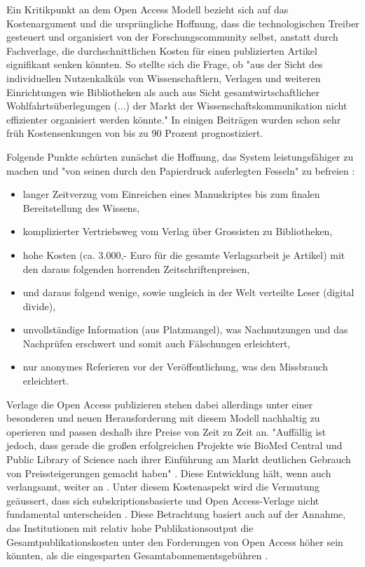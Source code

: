 Ein Kritikpunkt an dem Open Access Modell bezieht sich auf das Kostenargument und die ursprüngliche Hoffnung, dass die technologischen Treiber gesteuert und organisiert von der Forschungscommunity selbst, anstatt durch Fachverlage, die durchschnittlichen Kosten für einen publizierten Artikel signifikant senken könnten. So stellte sich die Frage, ob "aus der Sicht des individuellen Nutzenkalküls von Wissenschaftlern, Verlagen und weiteren Einrichtungen wie Bibliotheken als auch aus Sicht gesamtwirtschaftlicher Wohlfahrtsüberlegungen (...) der Markt der Wissenschaftskommunikation nicht effizienter organisiert werden könnte." \cite{Hess_2006} In einigen Beiträgen wurden schon sehr früh Kostensenkungen von bis zu 90 Prozent \cite{hilf_2004} \cite{suchen} prognostiziert.

Folgende Punkte schürten zunächst die Hoffnung, das System leistungsfähiger zu machen und "von seinen durch den Papierdruck auferlegten Fesseln" zu befreien \cite{hilf_2004}:
\begin{itemize}
\item langer Zeitverzug vom Einreichen eines Manuskriptes bis zum finalen Bereitstellung des Wissens,
\item komplizierter Vertriebsweg vom Verlag über Grossisten zu Bibliotheken,
\item hohe Kosten (ca. 3.000,- Euro für die gesamte Verlagsarbeit je Artikel) mit den daraus folgenden horrenden Zeitschriftenpreisen,
\item und daraus folgend wenige, sowie ungleich in der Welt verteilte Leser (digital divide),
\item unvollständige Information (aus Platzmangel), was Nachnutzungen und das Nachprüfen erschwert und somit auch Fälschungen erleichtert,
\item nur anonymes Referieren vor der Veröffentlichung, was den Missbrauch erleichtert.
\end{itemize}

Verlage die Open Access publizieren stehen dabei allerdings unter einer besonderen und neuen Herausforderung mit diesem Modell nachhaltig zu operieren und passen deshalb ihre Preise von Zeit zu Zeit an. "Auffällig ist jedoch, dass gerade die großen erfolgreichen Projekte wie BioMed Central und Public Library of Science nach ihrer Einführung am Markt deutlichen Gebrauch von Preissteigerungen gemacht haben" \cite{schmidt_2007_goldenen}. Diese Entwicklung hält, wenn auch verlangsamt, weiter an \cite{suchen}. Unter diesem Kostenaspekt wird die Vermutung geäussert, dass sich subskriptionsbasierte und Open Access-Verlage nicht fundamental unterscheiden \cite{schmidt_2007_goldenen}. Diese Betrachtung basiert auch auf der Annahme, das Institutionen mit relativ hohe Publikationsoutput die Gesamtpublikationskosten unter den Forderungen von Open Access höher sein könnten, als die eingesparten Gesamtabonnementsgebühren \cite{mueller-langer_2010}.

